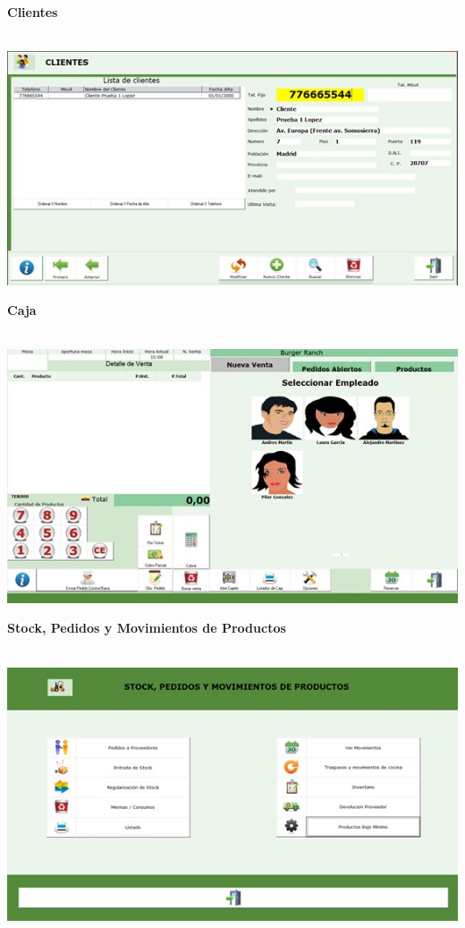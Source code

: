 \documentclass[12pt,a4paper]{article}
\begin{document}
 \par\vspace{6cm}
\textbf {Clientes}\\\\
\begin{center}
 \includegraphics[scale=0.7]{6.jpg} 
 \end{center}
 \par\vspace{0.5cm}
\textbf {Caja}\\\\
\begin{center}
 \includegraphics[scale=0.7]{7.jpg} 
 \end{center}
 \par\vspace{6cm}
\textbf {Stock, Pedidos y Movimientos de Productos}\\\\
\begin{center}
 \includegraphics[scale=0.7]{8.jpg} 
 \end{center}
\end{document}
